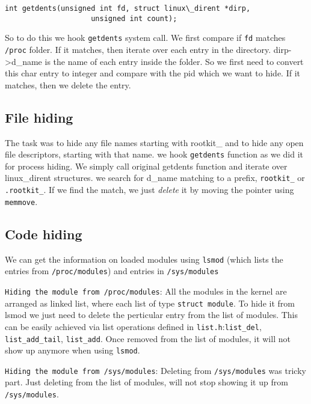 \documentclass[10pt, letterpaper]{scrartcl}
\begin{document}
\begin{verbatim}
int getdents(unsigned int fd, struct linux\_dirent *dirp,
                    unsigned int count);
\end{verbatim}


So to do this we hook \texttt{getdents} system call. 
We first compare if \texttt{fd} matches \texttt{/proc} folder. 
If it matches, then iterate over each entry in the directory.
dirp->d\_name is the name of each entry inside the folder. 
So we first need to convert this char entry to integer and compare with the pid which we want to hide.
If it matches, then we delete the entry. 

\subsection{File hiding}
The task was to hide any file names starting with rootkit\_ and to hide any open file descriptors, 
starting with that name. we hook \texttt{getdents} function as we did it for process hiding. 
We simply call original getdents function and iterate over linux\_dirent structures.
we search for d\_name matching to a prefix, \texttt{rootkit\_} or \texttt{.rootkit\_}. 
If we find the match, we just {\em delete} it by moving the pointer using \texttt{memmove}.


\subsection{Code hiding}
We can get the information on loaded modules using \texttt{lsmod}
(which lists the entries from \texttt{/proc/modules}) and entries in \texttt{/sys/modules}

\texttt{Hiding the module from /proc/modules}: All the modules in the kernel are arranged as linked list, 
where each list of type \texttt{struct module}. 
To hide it from lsmod we just need to delete the perticular entry from the list of modules. 
This can be easily achieved via list operations defined in \texttt{list.h}:\texttt{list\_del}, 
\texttt{list\_add\_tail}, \texttt{list\_add}. Once removed from the list of modules, 
it will not show up anymore when using \texttt{lsmod}. 

\texttt{Hiding the module from /sys/modules}: Deleting from \texttt{/sys/modules} was tricky part. 
Just deleting from the list of modules, 
will not stop showing it up from \texttt{/sys/modules}. 
\end{document}
